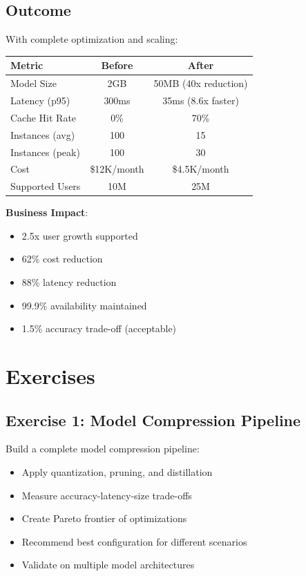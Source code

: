 \subsection{Outcome}

With complete optimization and scaling:

\begin{table}[h]
\centering
\begin{tabular}{lcc}
\toprule
\textbf{Metric} & \textbf{Before} & \textbf{After} \\
\midrule
Model Size & 2GB & 50MB (40x reduction) \\
Latency (p95) & 300ms & 35ms (8.6x faster) \\
Cache Hit Rate & 0\% & 70\% \\
Instances (avg) & 100 & 15 \\
Instances (peak) & 100 & 30 \\
Cost & \$12K/month & \$4.5K/month \\
Supported Users & 10M & 25M \\
\bottomrule
\end{tabular}
\end{table}

\textbf{Business Impact}:
\begin{itemize}
    \item 2.5x user growth supported
    \item 62\% cost reduction
    \item 88\% latency reduction
    \item 99.9\% availability maintained
    \item 1.5\% accuracy trade-off (acceptable)
\end{itemize}

\section{Exercises}

\subsection{Exercise 1: Model Compression Pipeline}

Build a complete model compression pipeline:
\begin{itemize}
    \item Apply quantization, pruning, and distillation
    \item Measure accuracy-latency-size trade-offs
    \item Create Pareto frontier of optimizations
    \item Recommend best configuration for different scenarios
    \item Validate on multiple model architectures
\end{itemize}

